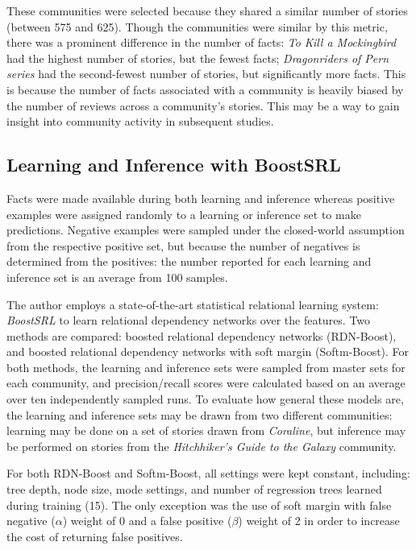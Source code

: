 \documentclass[letterpaper]{article}
\begin{document}
These communities were selected because they shared a similar number of stories (between 575 and 625). Though the communities were similar by this metric, there was a prominent difference in the number of facts: \textit{To Kill a Mockingbird} had the highest number of stories, but the fewest facts; \textit{Dragonriders of Pern series} had the second-fewest number of stories, but significantly more facts. This is because the number of facts associated with a community is heavily biased by the number of reviews across a community's stories. This may be a way to gain insight into community activity in subsequent studies.

\subsection{Learning and Inference with BoostSRL}

Facts were made available during both learning and inference whereas positive examples were assigned randomly to a learning or inference set to make predictions.  Negative examples were sampled under the closed-world assumption from the respective positive set, but because the number of negatives is determined from the positives: the number reported for each learning and inference set is an average from 100 samples.

The author employs a state-of-the-art statistical relational learning system: \textit{BoostSRL} to learn relational dependency networks over the features. Two methods are compared: boosted relational dependency networks (RDN-Boost), and boosted relational dependency networks with soft margin (Softm-Boost). For both methods, the learning and inference sets were sampled from master sets for each community, and precision/recall scores were calculated based on an average over ten independently sampled runs. To evaluate how general these models are, the learning and inference sets may be drawn from two different communities: learning may be done on a set of stories drawn from \textit{Coraline}, but inference may be performed on stories from the \textit{Hitchhiker's Guide to the Galaxy} community.

For both RDN-Boost and Softm-Boost, all settings were kept constant, including: tree depth, node size, mode settings, and number of regression trees learned during training (15). The only exception was the use of soft margin with false negative ($\alpha$) weight of 0 and a false positive ($\beta$) weight of 2 in order to increase the cost of returning false positives.
\end{document}
